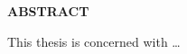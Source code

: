 


\begin{center}
	{\bfseries ABSTRACT}
\end{center}

\begin{onehalfspace}
	This thesis is concerned with \ldots
\end{onehalfspace}




